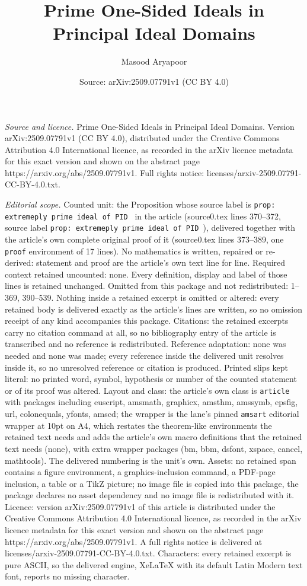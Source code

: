 \documentclass[10pt,a4paper]{amsart}
\title[Prime One-Sided Ideals in Principal Ideal Domains]{Prime One-Sided Ideals in Principal Ideal Domains}
\author{Masood Aryapoor}
\date{Source: arXiv:2509.07791v1 (CC BY 4.0)}
\begin{document}
\maketitle

\noindent\emph{Source and licence.} Prime One-Sided Ideals in Principal Ideal Domains. Version arXiv:2509.07791v1 (CC BY 4.0), distributed under the Creative Commons Attribution 4.0 International licence, as recorded in the arXiv licence metadata for this exact version and shown on the abstract page https://arxiv.org/abs/2509.07791v1. Full rights notice: licenses/arxiv-2509.07791-CC-BY-4.0.txt.\par\smallskip

\noindent\textit{Editorial scope.} Counted unit: the Proposition whose source label is \texttt{prop: extremeply prime ideal of PID } in the article (source0.tex lines 370--372, source label \texttt{prop: extremeply prime ideal of PID }), delivered together with the article's own complete original proof of it (source0.tex lines 373--389, one \texttt{proof} environment of 17 lines). No mathematics is written, repaired or re-derived: statement and proof are the article's own text line for line. Required context retained uncounted: none. Every definition, display and label of those lines is retained unchanged. Omitted from this package and not redistributed: 1--369, 390--539. Nothing inside a retained excerpt is omitted or altered: every retained body is delivered exactly as the article's lines are written, so no omission receipt of any kind accompanies this package. Citations: the retained excerpts carry no citation command at all, so no bibliography entry of the article is transcribed and no reference is redistributed. Reference adaptation: none was needed and none was made; every reference inside the delivered unit resolves inside it, so no unresolved reference or citation is produced. Printed slips kept literal: no printed word, symbol, hypothesis or number of the counted statement or of its proof was altered. Layout and class: the article's own class is \texttt{article} with packages including euscript, amsmath, graphicx, amsthm, amssymb, epsfig, url, colonequals, yfonts, amscd; the wrapper is the lane's pinned \texttt{amsart} editorial wrapper at 10pt on A4, which restates the theorem-like environments the retained text needs and adds the article's own macro definitions that the retained text needs (none), with extra wrapper packages (bm, bbm, dsfont, xspace, cancel, mathtools). The delivered numbering is the unit's own. Assets: no retained span contains a figure environment, a graphics-inclusion command, a PDF-page inclusion, a table or a TikZ picture; no image file is copied into this package, the package declares no asset dependency and no image file is redistributed with it. Licence: version arXiv:2509.07791v1 of this article is distributed under the Creative Commons Attribution 4.0 International licence, as recorded in the arXiv licence metadata for this exact version and shown on the abstract page https://arxiv.org/abs/2509.07791v1. A full rights notice is delivered at licenses/arxiv-2509.07791-CC-BY-4.0.txt. Characters: every retained excerpt is pure ASCII, so the delivered engine, XeLaTeX with its default Latin Modern text font, reports no missing character.
\end{document}
